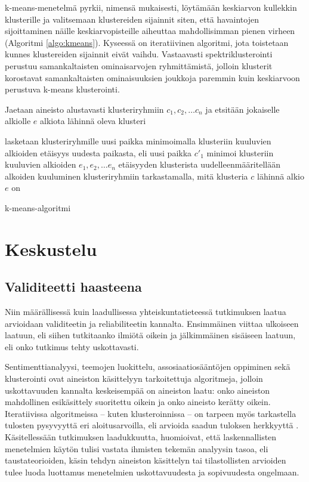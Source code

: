 \documentclass[finnish,gradu,twoside,12pt]{tktltiki}
\begin{document}
{k-means-menetelmä pyrkii, nimensä mukaisesti, löytämään keskiarvon kullekkin klusterille ja valitsemaan klustereiden sijainnit siten, että havaintojen sijoittaminen näille keskiarvopisteille aiheuttaa mahdollisimman pienen virheen (Algoritmi \ref{algo:kmeans}). Kyseessä on iteratiivinen algoritmi, jota toistetaan kunnes klustereiden sijainnit eivät vaihdu. Vastaavasti spektriklusterointi perustuu samankaltaisten ominaisarvojen ryhmittämistä, jolloin klusterit korostavat samankaltaisten ominaisuuksien joukkoja paremmin kuin keskiarvoon perustuva k-means klusterointi.


\begin{algorithm}
\begin{algorithmic}

\State Jaetaan aineisto alustavasti klusteriryhmiin $c_1, c_2, \ldots c_n$ ja etsitään jokaiselle alkiolle $e$ alkiota lähinnä oleva klusteri


\State lasketaan klusteriryhmille uusi paikka minimoimalla klusteriin kuuluvien alkioiden etäisyys uudesta paikasta, eli uusi paikka $c'_1$ minimoi klusteriin kuuluvien alkioiden $e_{1}, e_{2}, \ldots e_{n}$ etäisyyden klusterista
\State uudelleenmääritellään alkoiden kuuluminen klusteriryhmiin tarkastamalla, mitä klusteria $c$ lähinnä alkio $e$ on

\EndWhile

\end{algorithmic}
\caption{k-means-algoritmi}
\label{algo:kmeans}
\end{algorithm}


\section{Keskustelu}

\subsection{Validiteetti haasteena}

Niin määrällisessä kuin laadullisessa yhteiskuntatieteessä tutkimuksen laatua arvioidaan validiteetin ja reliabiliteetin kannalta. Ensimmäinen viittaa ulkoiseen laatuun, eli siihen tutkitaanko ilmiötä oikein ja jälkimmäinen sisäiseen laatuun, eli onko tutkimus tehty uskottavasti.

Sentimenttianalyysi, teemojen luokittelu, assosiaatiosääntöjen oppiminen sekä klusterointi ovat aineiston käsittelyyn tarkoitettuja algoritmeja, jolloin uskottavuuden kannalta keskeisempää on aineiston laatu: onko aineiston mahdollinen esikäsittely suoritettu oikein ja onko aineisto kerätty oikein. Iteratiivissa algoritmeissa -- kuten klusteroinnissa -- on tarpeen myös tarkastella tulosten pysyvyyttä eri aloitusarvoilla, eli arvioida saadun tuloksen herkkyyttä . Käsitellessään tutkimuksen laadukkuutta, \citet{Grimmer2013} huomioivat, että laskennallisten menetelmien käytön tulisi vastata ihmisten tekemän analyysin tasoa, eli taustateorioiden, käsin tehdyn aineiston käsittelyn tai tilastollisten arvioiden tulee luoda luottamus menetelmien uskottavuudesta ja sopivuudesta ongelmaan.

}
\end{document}
